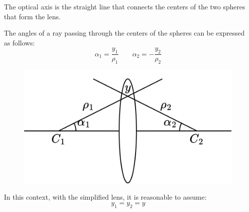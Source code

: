 \begin{definition}
    The optical axis is the straight line that connects the centers of the two spheres that form the lens.
\end{definition}
The angles of a ray passing through the centers of the spheres can be expressed as follows:
\[\alpha_1=\dfrac{y_1}{\rho_1} \qquad \alpha_2=-\dfrac{y_2}{\rho_2}\]
\begin{figure}[H]
    \centering
    \includegraphics[width=0.4\linewidth]{images/y.png}
\end{figure}
In this context, with the simplified lens, it is reasonable to assume:
\[y_1=y_2=y\]